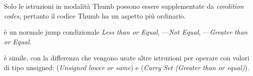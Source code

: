 
Solo le istruzioni  in modalità Thumb possono essere supplementate da \emph{condition codes}, pertanto il codice Thumb 
ha un aspetto più ordinario.

 è un normale jump condizionale \emph{Less than or Equal}, 
---\emph{Not Equal}, 
---\emph{Greater than or Equal}.

 è simile, con la differenza che vengono usate altre istruzioni per operare con valori
di tipo unsigned:  
(\emph{Unsigned lower or same}) e  (\emph{Carry Set (Greater than or equal)}).
